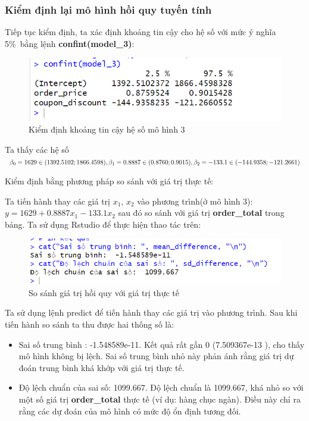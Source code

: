 \subsubsection{Kiểm định lại mô hình hồi quy tuyến tính}
Tiếp tục kiểm định, ta xác định khoảng tin cậy cho hệ số với mức ý nghĩa 5\%\ bằng lệnh \textbf{confint(model\_3)}:
\begin{figure}[H]
  \centering
  \includegraphics[width=0.7\linewidth]{graphics/5.5.5.png}
  \caption{Kiểm định khoảng tin cậy hệ số mô hình 3 }
\end{figure}

Ta thấy các hệ số $\beta_0= 1629\in(1392.5102; 1866.4598), \beta_1= 0.8887\in(0.8760; 0.9015),\\ \beta_2= -133.1\in(-144.9358; -121.2661)$

Kiểm định bằng phương pháp so sánh với giá trị thực tế:

Ta tiến hành thay các giá trị $x_1$, $x_2$ vào phương trình(ở mô hình 3): $y= 1629 + 0.8887x_1 - 133.1 x_2$ sau đó so sánh với giá trị \textbf{order\_total} trong bảng. Ta sử dụng Rstudio để thực hiện thao tác trên:

\begin{figure}[H]
  \centering
  \includegraphics[width=0.7\linewidth]{graphics/5.5.7.png}
  \caption{So sánh giá trị hồi quy với giá trị thực tế }
\end{figure}

Ta sử dụng lệnh predict để tiến hành thay các giá trị vào phương trình. Sau khi tiến hành so sánh ta thu được hai thống số là:
\begin{itemize}
  \item Sai số trung bình : -1.548589e-11. Kết quả rất gần 0 (7.509367e-13 ), cho thấy mô hình không bị lệch. Sai số trung bình nhỏ này phản ánh rằng giá trị dự đoán trung bình khá khớp với giá trị thực tế.
  \item Độ lệch chuẩn của sai số: 1099.667. Độ lệch chuẩn là 1099.667, khá nhỏ so với một số giá trị \textbf{order\_total} thực tế (ví dụ: hàng chục ngàn). Điều này chỉ ra rằng các dự đoán của mô hình có mức độ ổn định tương đối.
\end{itemize}

